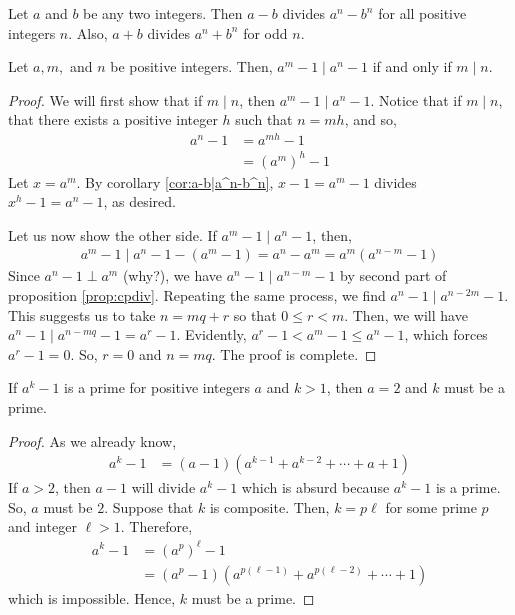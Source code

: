 \documentclass{subfile}
\begin{document}
	\begin{corollary}
		\label{cor:a-b|a^n-b^n}
		Let $a$ and $b$ be any two integers. Then $a-b$ divides $a^n-b^n$ for all positive integers $n$. Also, $a+b$ divides $a^n+b^n$ for odd $n$.
	\end{corollary}


	\begin{theorem}\label{thm:powerdiv}
		Let $a,m,$ and $n$ be positive integers. Then, $a^m-1\mid a^n-1$ if and only if $m\mid n$.
	\end{theorem}

	\begin{proof}
		We will first show that if $m\mid n$, then $a^m-1\mid a^n-1$. Notice that if $m\mid n$, that there exists a positive integer $h$ such that $n=mh$, and so,
		\begin{align*}
			a^n-1
				& = a^{mh}-1\\
				& = \left( a^m\right)^h -1
		\end{align*}
		Let $x=a^m$. By corollary \eqref{cor:a-b|a^n-b^n}, $x-1=a^m-1$ divides $x^h-1=a^n-1$, as desired.

		Let us now show the other side. If $a^m-1\mid a^n-1$, then,
		\begin{align*}
			a^m-1\mid a^n-1-(a^m-1)=a^n-a^m=a^m(a^{n-m}-1)
		\end{align*}
		Since $a^n-1\perp a^m$ (why?), we have $a^n-1\mid a^{n-m}-1$ by second part of proposition \eqref{prop:cpdiv}. Repeating the same process, we find $a^n-1\mid a^{n-2m}-1$. This suggests us to take $n=mq+r$ so that $0\leq r<m$. Then, we will have $a^n-1\mid a^{n-mq}-1=a^r-1$. Evidently, $a^r-1<a^m-1\leq a^n-1$, which forces $a^r-1=0$. So, $r=0$ and $n=mq$. The proof is complete.
	\end{proof}

	\begin{theorem}
		\label{thm:a^k-1prime}
		If $a^k-1$ is a prime for positive integers $a$ and $k>1$, then $a=2$ and $k$ must be a prime.
	\end{theorem}

	\begin{proof}
		As we already know,
		\begin{align*}
			a^k-1 & = (a-1)(a^{k-1}+a^{k-2}+\cdots+a+1)
		\end{align*}
		If $a>2$, then $a-1$ will divide $a^k-1$ which is absurd because $a^k-1$ is a prime. So, $a$ must be $2$. Suppose that $k$ is composite. Then, $k=p\ell$ for some prime $p$ and integer $\ell>1$. Therefore,
		\begin{align*}
			a^k-1&=\left(a^p\right)^\ell -1\\
			&= (a^p-1)\left(a^{p(\ell-1)}+a^{p(\ell-2)}+\cdots+1\right)
		\end{align*}
		which is impossible. Hence, $k$ must be a prime.
	\end{proof}
\end{document}
